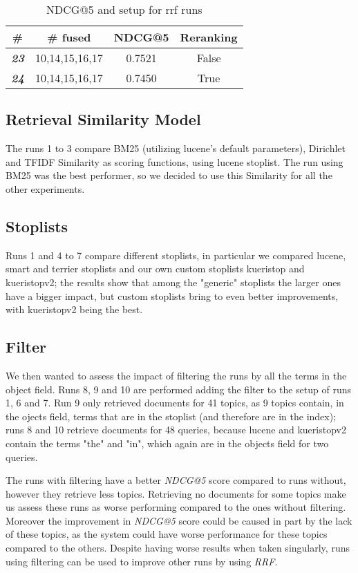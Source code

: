 \begin{table}[t]
	\caption{NDCG@5 and setup for rrf runs}
	\label{tab:results-rrf-table}
	\centering
	\begin{tabular}{|c|c|c|c|}
		\toprule
		\# & \# fused & NDCG@5 & Reranking \\
		\midrule
		\textit{\textbf{23}} & 10,14,15,16,17 & 0.7521 & False \\
		\textit{\textbf{24}} & 10,14,15,16,17 & 0.7450 & True \\
		\bottomrule
	\end{tabular}
\end{table}

\subsection{Retrieval Similarity Model}
The runs 1 to 3 compare BM25 (utilizing lucene's default parameters), Dirichlet and TFIDF Similarity as scoring functions, using lucene stoplist.
The run using BM25 was the best performer, so we decided to use this Similarity for all the other experiments.

\subsection{Stoplists}
Runs 1 and 4 to 7 compare different stoplists, in particular we compared lucene, smart and terrier stoplists and our own custom stoplists kueristop and kueristopv2; the results show that among the "generic" stoplists the larger ones have a bigger impact, but custom stoplists bring to even better improvements, with kueristopv2 being the best.

\subsection{Filter}
We then wanted to assess the impact of filtering the runs by all the terms in the object field.
Runs 8, 9 and 10 are performed adding the filter to the setup of runs 1, 6 and 7.
Run 9 only retrieved documents for 41 topics, as 9 topics contain, in the ojects field, terms that are in the stoplist (and therefore are in the index); runs 8 and 10 retrieve documents for 48 queries, because lucene and kueristopv2 contain the terms "the" and "in", which again are in the objects field for two queries.

The runs with filtering have a better \textit{NDCG@5} score compared to runs without, however they retrieve less topics. Retrieving no documents for some topics make us assess these runs as worse performing compared to the ones without filtering. Moreover the improvement in \textit{NDCG@5} score could be caused in part by the lack of these topics, as the system could have worse performance for these topics compared to the others.
Despite having worse results when taken singularly, runs using filtering can be used to improve other runs by using \textit{RRF}.

